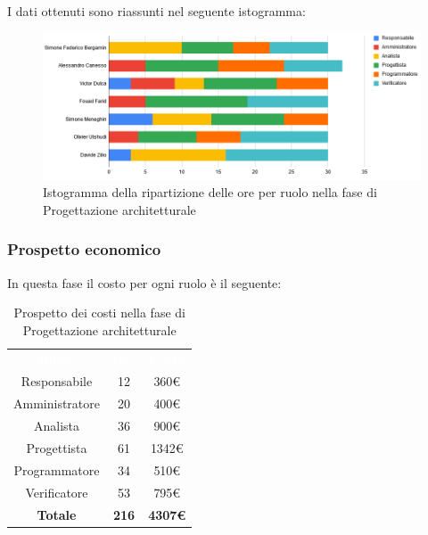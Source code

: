 I dati ottenuti sono riassunti nel seguente istogramma:
\begin{figure}[H]
\centering
\includegraphics[scale=0.60]{img/grafici/tabella_fase_prog_architetturale.png}
\caption{Istogramma della ripartizione delle ore per ruolo nella fase di Progettazione architetturale}
\end{figure}
 
\subsubsection{Prospetto economico}
In questa fase il costo per ogni ruolo è il seguente:
 
\begin{table}[H]
\centering\renewcommand{\arraystretch}{1.5}
\caption{Prospetto dei costi nella fase di Progettazione architetturale}
\vspace{0.2cm}
\begin{tabular}{ c | c | c  }
\rowcolor{redafk}
\textcolor{white}{\textbf{Ruolo}} & \textcolor{white}{\textbf{Ore}} &
\textcolor{white}{\textbf{Costo}}  \\
Responsabile & 12 & 360€ \\
Amministratore & 20 & 400€ \\
Analista & 36 & 900€ \\
Progettista & 61 & 1342€ \\
Programmatore & 34 & 510€  \\
Verificatore & 53 & 795€  \\
\rowcolor{lastrowcolor}
\textbf{Totale} & \textbf{216} & \textbf{4307€}  \\
\end{tabular}
\end{table}
 
